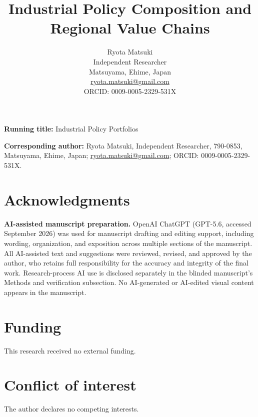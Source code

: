 \documentclass[11pt]{article}
\title{Industrial Policy Composition and Regional Value Chains}
\author{Ryota Matsuki\\[0.5em]
Independent Researcher\\
Matsuyama, Ehime, Japan\\
\href{mailto:ryota.matsuki@gmail.com}{ryota.matsuki@gmail.com}\\
ORCID: 0009-0005-2329-531X}
\date{}
\begin{document}
\maketitle

\noindent\textbf{Running title:} Industrial Policy Portfolios
\par\medskip
\noindent\textbf{Corresponding author:} Ryota Matsuki, Independent Researcher, 790-0853, Matsuyama, Ehime, Japan; \href{mailto:ryota.matsuki@gmail.com}{ryota.matsuki@gmail.com}; ORCID: 0009-0005-2329-531X.

\section*{Acknowledgments}
\noindent\textbf{AI-assisted manuscript preparation.}
OpenAI ChatGPT (GPT-5.6, accessed September 2026) was used for manuscript drafting and editing support, including wording, organization, and exposition across multiple sections of the manuscript. All AI-assisted text and suggestions were reviewed, revised, and approved by the author, who retains full responsibility for the accuracy and integrity of the final work. Research-process AI use is disclosed separately in the blinded manuscript's Methods and verification subsection. No AI-generated or AI-edited visual content appears in the manuscript.

\section*{Funding}
This research received no external funding.

\section*{Conflict of interest}
The author declares no competing interests.
\end{document}

